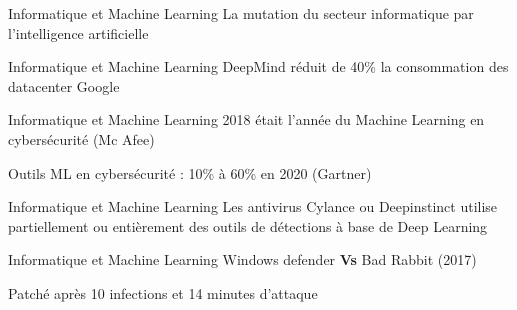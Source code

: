 \begin{frame}{Informatique et Machine Learning}
  La mutation du secteur informatique par l'intelligence artificielle
\end{frame}

\begin{frame}{Informatique et Machine Learning}
  DeepMind réduit de 40\% la consommation des datacenter Google
\end{frame}

\begin{frame}{Informatique et Machine Learning}
  2018 était l'année du Machine Learning en cybersécurité (Mc Afee)

  Outils ML en cybersécurité : 10\% à 60\% en 2020 (Gartner)
\end{frame}

\begin{frame}{Informatique et Machine Learning}
  Les antivirus Cylance ou Deepinstinct utilise partiellement ou entièrement des outils de détections à base de Deep Learning

  \begin{minipage}[c]{0.49\linewidth}
  \end{minipage}\hfill
  \begin{minipage}[c]{0.49\linewidth}
  \end{minipage}\hfill
\end{frame}

\begin{frame}{Informatique et Machine Learning}
  Windows defender \textbf{Vs} Bad Rabbit (2017)

  Patché après 10 infections et 14 minutes d'attaque

  \begin{minipage}[c]{0.49\linewidth}
  \end{minipage}\hfill
  \begin{minipage}[c]{0.49\linewidth}
  \end{minipage}\hfill
\end{frame}

